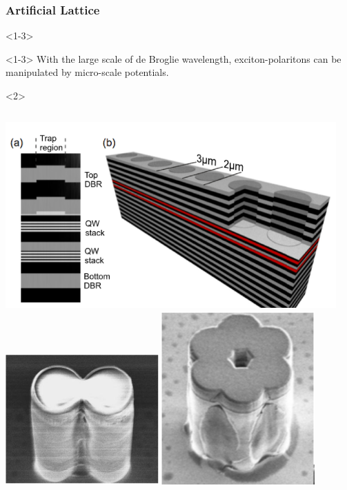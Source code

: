 \documentclass[9pt]{beamer}
\begin{document}
\begin{frame}[t]
\frametitle{Artificial Lattice}
\begin{onlyenv}<1-3>
\begin{block}{}<1-3>
With the large scale of de Broglie wavelength, exciton-polaritons can be manipulated by micro-scale potentials.\\
\end{block}
\end{onlyenv}

\begin{onlyenv}<2>
\begin{center}
\begin{columns}
\includegraphics[width=0.95\textwidth]{./fig/lattice0.png}\\
\includegraphics[width=0.44\textwidth]{./fig/twowell.png}
\includegraphics[width=0.44\textwidth]{./fig/bentz.png}

\end{columns}
\end{center}
\end{onlyenv}
\end{frame}
\end{document}
